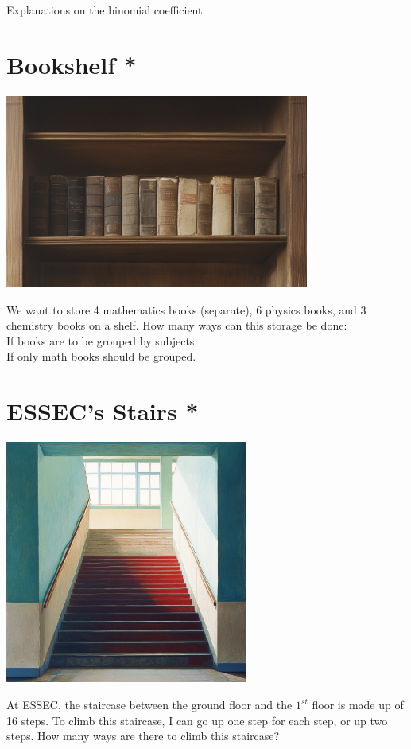 \documentclass[]{article}
\begin{document}
	Explanations on the binomial coefficient.
	
	\section{Bookshelf *}
	\begin{center}
		\includegraphics[width=10cm]{bookshelf.png}
	\end{center}
	We want to store 4 mathematics books (separate), 6 physics books, and 3 chemistry books on a shelf.
	How many ways can this storage be done:\\
	If books are to be grouped by subjects.\\
	If only math books should be grouped.
	
	\section{ESSEC's Stairs *}
	\begin{center}
		\includegraphics[height=8cm]{stairs.png}
	\end{center}
	At ESSEC, the staircase between the ground floor and the $1^{st}$ floor is made up of 16 steps.
	To climb this staircase, I can go up one step for each step, or up two steps. How many ways are there to climb this staircase?
	
	
	
	
\end{document}
